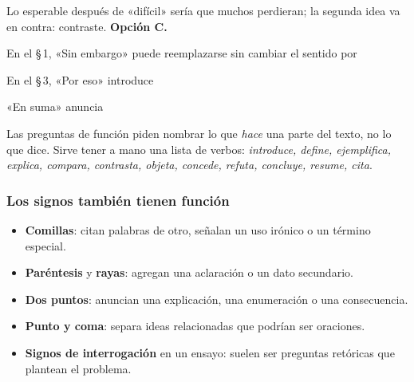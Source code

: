 \begin{retoresuelto}
Lo esperable después de «difícil» sería que muchos perdieran; la segunda idea va en contra: contraste. \textbf{Opción C.}
\end{retoresuelto}

\taller
{}
\begin{ejercicios}
\item En el \S\,1, «Sin embargo» puede reemplazarse sin cambiar el sentido por
\item En el \S\,3, «Por eso» introduce
\item «En suma»  anuncia
\end{ejercicios}

\bitacora


Las preguntas de función piden nombrar lo que \emph{hace} una parte del texto, no lo que dice. Sirve tener a mano una lista
de verbos: \emph{introduce, define, ejemplifica, explica, compara, contrasta, objeta, concede, refuta, concluye, resume,
cita}.

\subsubsection{Los signos también tienen función}
\begin{itemize}
  \item \textbf{Comillas}: citan palabras de otro, señalan un uso irónico o un término especial.
  \item \textbf{Paréntesis} y \textbf{rayas}: agregan una aclaración o un dato secundario.
  \item \textbf{Dos puntos}: anuncian una explicación, una enumeración o una consecuencia.
  \item \textbf{Punto y coma}: separa ideas relacionadas que podrían ser oraciones.
  \item \textbf{Signos de interrogación} en un ensayo: suelen ser preguntas retóricas que plantean el problema.
\end{itemize}

